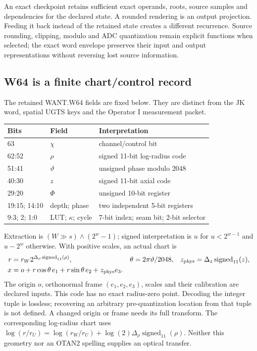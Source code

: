 An exact checkpoint retains sufficient exact operands, roots, source samples
and dependencies for the declared state. A rounded rendering is an output
projection. Feeding it back instead of the retained state creates a different
recurrence. Source rounding, clipping, modulo and ADC quantization remain
explicit functions when selected; the exact word envelope preserves their
input and output representations without reversing lost source information.

\subsection{W64 is a finite chart/control record}
\label{sec:r14-w64-binding}
The retained WANT.W64 fields are fixed below. They are distinct from the JK
word, spatial UGTS keys and the Operator I measurement packet.
\begin{center}\small
\begin{tabular}{@{}lll@{}}\toprule
Bits & Field & Interpretation\\\midrule
63 & $\chi$ & channel/control bit\\
62:52 & $\rho$ & signed 11-bit log-radius code\\
51:41 & $\vartheta$ & unsigned phase modulo 2048\\
40:30 & $z$ & signed 11-bit axial code\\
29:20 & $\Phi$ & unsigned 10-bit register\\
19:15; 14:10 & depth; phase & two independent 5-bit registers\\
9:3; 2; 1:0 & LUT; $\kappa$; cycle & 7-bit index; seam bit; 2-bit selector\\\bottomrule
\end{tabular}\end{center}
Extraction is $(W\gg s)\land(2^w-1)$; signed interpretation is $u$ for
$u<2^{w-1}$ and $u-2^w$ otherwise. With positive scales, an actual chart is
\begin{align}
 r&=r_W2^{\Delta_\rho\operatorname{signed}_{11}(\rho)},&
 \theta&=2\pi\vartheta/2048,&
 z_{\rm phys}&=\Delta_z\operatorname{signed}_{11}(z),\nonumber\\
 x&=o+r\cos\theta\,e_1+r\sin\theta\,e_2+z_{\rm phys}e_3.
 \label{eq:r14-w64-chart}
\end{align}
The origin $o$, orthonormal frame $(e_1,e_2,e_3)$, scales and their calibration
are declared inputs. This code has no exact radius-zero point. Decoding the
integer tuple is lossless; recovering an arbitrary pre-quantization location
from that tuple is not defined. A changed origin or frame needs its full
transform. The corresponding log-radius chart uses
$\log(r/r_U)=\log(r_W/r_U)+\log(2)\Delta_\rho\operatorname{signed}_{11}(\rho)$.
Neither this geometry nor an OTAN2 spelling supplies an optical transfer.

